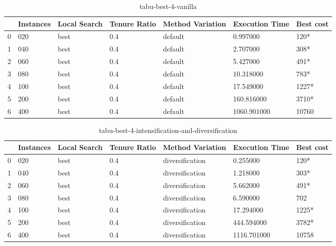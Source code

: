 \begin{table}
    \centering
    \begin{tabular}{lllllll}
        \toprule
        {} & Instances & Local Search & Tenure Ratio & Method Variation & Execution Time & Best cost \\
        \midrule
        0  & 020       & best         & 0.4          & default          & 0.997000       & 120*      \\
        1  & 040       & best         & 0.4          & default          & 2.707000       & 308*      \\
        2  & 060       & best         & 0.4          & default          & 5.427000       & 491*      \\
        3  & 080       & best         & 0.4          & default          & 10.318000      & 783*      \\
        4  & 100       & best         & 0.4          & default          & 17.549000      & 1227*     \\
        5  & 200       & best         & 0.4          & default          & 160.816000     & 3710*     \\
        6  & 400       & best         & 0.4          & default          & 1060.901000    & 10760     \\
        \bottomrule
    \end{tabular}
    \caption{tabu-best-4-vanilla}
    \label{table:tabu-best-4-vanilla}
\end{table}

\begin{table}
    \centering
    \begin{tabular}{lllllll}
        \toprule
        {} & Instances & Local Search & Tenure Ratio & Method Variation & Execution Time & Best cost \\
        \midrule
        0  & 020       & best         & 0.4          & diversification  & 0.255000       & 120*      \\
        1  & 040       & best         & 0.4          & diversification  & 1.218000       & 303*      \\
        2  & 060       & best         & 0.4          & diversification  & 5.662000       & 491*      \\
        3  & 080       & best         & 0.4          & diversification  & 6.590000       & 702       \\
        4  & 100       & best         & 0.4          & diversification  & 17.294000      & 1225*     \\
        5  & 200       & best         & 0.4          & diversification  & 444.594000     & 3782*     \\
        6  & 400       & best         & 0.4          & diversification  & 1116.701000    & 10758     \\
        \bottomrule
    \end{tabular}
    \caption{tabu-best-4-intensification-and-diversification}
    \label{table:tabu-best-4-intensification-and-diversification}
\end{table}
